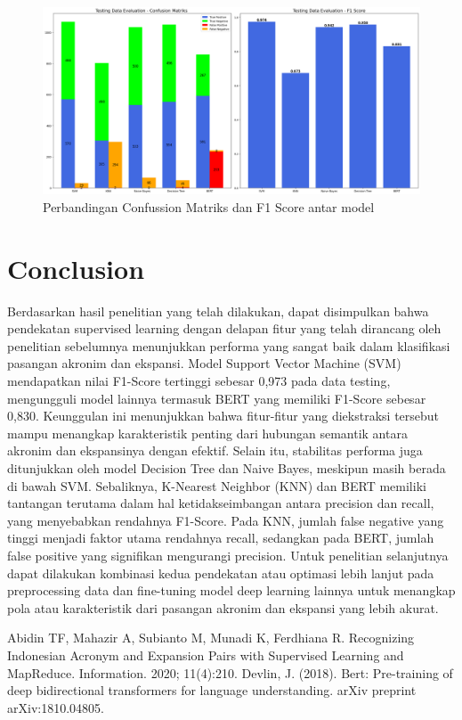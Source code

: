 \documentclass{article}\usepackage{float}
\begin{document}
\begin{figure}
\centering
\includegraphics[width=1\linewidth]{img/f1score_test.png}
\caption{\label{fig:f1score_test}Perbandingan Confussion Matriks dan F1 Score antar model}
\end{figure}

\section{Conclusion}

Berdasarkan hasil penelitian yang telah dilakukan, dapat disimpulkan bahwa pendekatan supervised learning dengan delapan fitur yang telah dirancang oleh penelitian sebelumnya menunjukkan performa yang sangat baik dalam klasifikasi pasangan akronim dan ekspansi. Model Support Vector Machine (SVM) mendapatkan nilai F1-Score tertinggi sebesar 0,973 pada data testing, mengungguli model lainnya termasuk BERT yang memiliki F1-Score sebesar 0,830. Keunggulan ini menunjukkan bahwa fitur-fitur yang diekstraksi tersebut mampu menangkap karakteristik penting dari hubungan semantik antara akronim dan ekspansinya dengan efektif. Selain itu, stabilitas performa juga ditunjukkan oleh model Decision Tree dan Naive Bayes, meskipun masih berada di bawah SVM. Sebaliknya, K-Nearest Neighbor (KNN) dan BERT memiliki tantangan terutama dalam hal ketidakseimbangan antara precision dan recall, yang menyebabkan rendahnya F1-Score. Pada KNN, jumlah false negative yang tinggi menjadi faktor utama rendahnya recall, sedangkan pada BERT, jumlah false positive yang signifikan mengurangi precision.
Untuk penelitian selanjutnya dapat dilakukan kombinasi kedua pendekatan atau optimasi lebih lanjut pada preprocessing data dan fine-tuning model deep learning lainnya untuk menangkap pola atau karakteristik dari pasangan akronim dan ekspansi yang lebih akurat.




\begin{thebibliography}{9}
 Abidin TF, Mahazir A, Subianto M, Munadi K, Ferdhiana R. Recognizing Indonesian Acronym and Expansion Pairs with Supervised Learning and MapReduce. Information. 2020; 11(4):210.
 Devlin, J. (2018). Bert: Pre-training of deep bidirectional transformers for language understanding. arXiv preprint arXiv:1810.04805.
\end{thebibliography}
\end{document}
